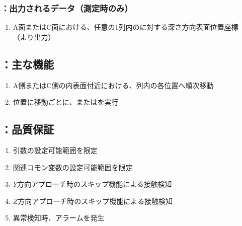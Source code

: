 \subsubsection{\DLtwoAC：出力されるデータ（測定時のみ）}
\begin{enumerate}[label*=\sarrow]
\item A面またはC面における、任意の1列内の\Dimple に対する深さ方向表面位置座標\\
（\DMLthreeAC より出力）
\end{enumerate}


\subsection{\DLtwoAC：主な機能}
\begin{enumerate}[label*=\sarrow]
\item A側またはC側の内表面付近における、列内の各\Dimple 位置へ順次移動
\item \Dimple 位置に移動ごとに、\DMLthreeAC または\DKLthreeAC を実行
\end{enumerate}


\subsection{\DLtwoAC：品質保証}
\begin{enumerate}[label*=\sarrow]
\item {}引数の設定可能範囲を限定
\item 関連コモン変数の設定可能範囲を限定
\item $Y$方向アプローチ時のスキップ機能による接触検知
\item $Z$方向アプローチ時のスキップ機能による接触検知
\item 異常検知時、アラームを発生
\end{enumerate}



